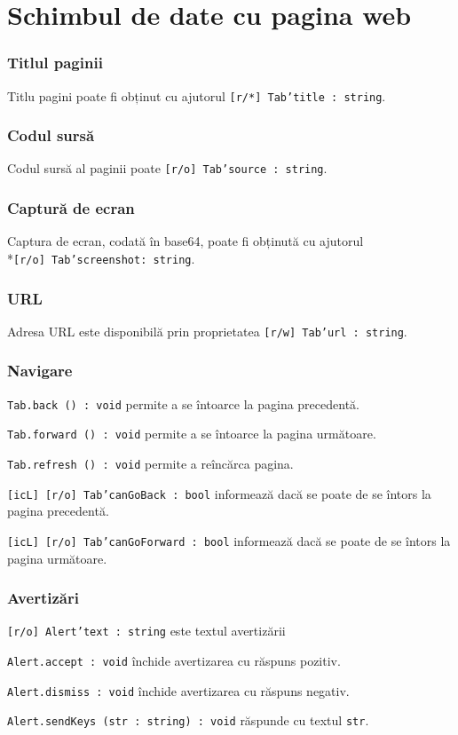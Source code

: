 \section{Schimbul de date cu pagina web}
\label{dataexchange}

\subsubsection{Titlul paginii}

Titlu pagini poate fi obținut cu ajutorul \texttt{[r/*] Tab'title : string}.

\subsubsection{Codul sursă}

Codul sursă al paginii poate \texttt{[r/o] Tab'source : string}.

\subsubsection{Captură de ecran}

Captura de ecran, codată în base64, poate fi obținută cu ajutorul \\*\texttt{[r/o] Tab'screenshot: string}.

\subsubsection{URL}

Adresa URL este disponibilă prin proprietatea \texttt{[r/w] Tab'url : string}.

\subsubsection{Navigare}

\texttt{Tab.back () : void} permite a se întoarce la pagina precedentă.

\texttt{Tab.forward () : void} permite a se întoarce la pagina următoare.

\texttt{Tab.refresh () : void}  permite a reîncărca pagina.

\texttt{[icL] [r/o] Tab'canGoBack : bool} informează dacă se poate de se întors la pagina precedentă.

\texttt{[icL] [r/o] Tab'canGoForward : bool} informează dacă se poate de se întors la pagina următoare.


\subsubsection{Avertizări}

\texttt{[r/o] Alert'text : string} este textul avertizării

\texttt{Alert.accept : void} închide avertizarea cu răspuns pozitiv.

\texttt{Alert.dismiss : void} închide avertizarea cu răspuns negativ.

\texttt{Alert.sendKeys (str : string) : void} răspunde cu textul \texttt{str}.

